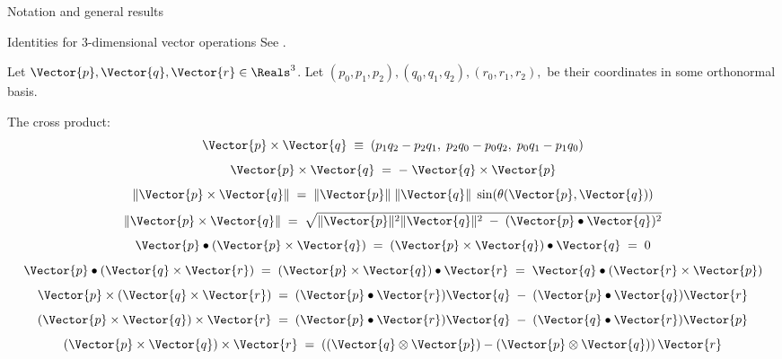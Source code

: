 \begin{plSection}{Notation and general results}
\begin{plSection}{Identities for 3-dimensional vector operations}
See .

Let $\Vector{p}, \Vector{q}, \Vector{r} \in \Reals^3$.
Let $(p_0,p_1,p_2), (q_0,q_1,q_2), (r_0,r_1,r_2), $ be their coordinates
in some orthonormal basis.

The cross product:
\begin{equation}
\Vector{p} \times \Vector{q}  
\; \equiv \; 
(p_1 q_2 - p_2 q_1, \; p_2 q_0 - p_0 q_2, \; p_0 q_1 - p_1 q_0)
\end{equation}
\begin{equation}
\Vector{p} \times \Vector{q}  
\; = \; - \; 
\Vector{q} \times \Vector{p}
\end{equation}
\begin{equation}
\| \Vector{p} \times \Vector{q} \| \; = \; \| \Vector{p} \| \;
 \| \Vector{q} \| \; \sin(\theta(\Vector{p},\Vector{q}))
\end{equation}
\begin{equation}
\| \Vector{p} \times \Vector{q} \|  
\; = \;  
\sqrt{\| \Vector{p} \|^2 \| \Vector{q} \|^2
 \; - \; (\Vector{p} \bullet \Vector{q})^2}
\end{equation}
\begin{equation}
\Vector{p} \bullet ( \Vector{p} \times \Vector{q} ) 
\; = \; ( \Vector{p} \times \Vector{q} ) \bullet \Vector{q} \; = \; 0
\end{equation}
\begin{equation}
\label{eq:dot_cross}
\Vector{p} \bullet ( \Vector{q} \times \Vector{r} ) 
\; = \; ( \Vector{p} \times \Vector{q} ) \bullet \Vector{r} 
\; = \; \Vector{q} \bullet ( \Vector{r} \times \Vector{p} )
\end{equation}
\begin{equation}
\Vector{p} \times ( \Vector{q} \times \Vector{r} )
 \; = \; 
 ( \Vector{p} \bullet \Vector{r} ) \Vector{q}
  \; - \; (\Vector{p} \bullet \Vector{q}) \Vector{r}
\end{equation}
\begin{equation}
( \Vector{p} \times \Vector{q} ) \times \Vector{r} 
\; = \; 
( \Vector{p} \bullet \Vector{r} ) \Vector{q} 
\; - \; (\Vector{q} \bullet \Vector{r}) \Vector{p}
\end{equation}
\begin{equation}
( \Vector{p} \times \Vector{q} ) \times \Vector{r} 
\; = \;
 \left((\Vector{q} \otimes \Vector{p})
  - (\Vector{p} \otimes \Vector{q})\right) \Vector{r}
\end{equation}


\end{plSection}
\end{plSection}

